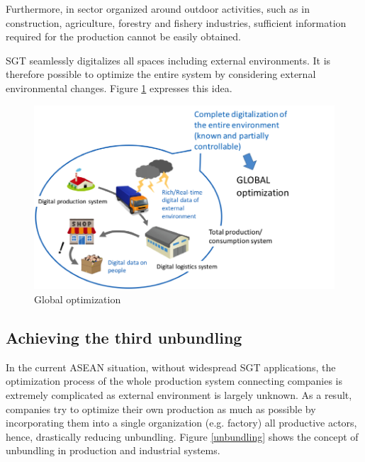 Furthermore, in sector organized around outdoor activities, such as in construction, agriculture, forestry and fishery industries, sufficient information required for the production cannot be easily obtained. 

\vspace{0.4 cm}

SGT seamlessly digitalizes all spaces including external environments. It is therefore possible to optimize the entire system by considering external environmental changes. Figure \ref{global_optimization} expresses this idea.

\begin{figure}[H]
\begin{center}
\includegraphics[width = 0.8\linewidth]{Figures/global_optimization.png}
\end{center}
\caption{Global optimization}
\label{global_optimization}
\end{figure}


\subsection{Achieving the third unbundling} \label{unbundling_p}

\tab In the current ASEAN situation, without widespread SGT applications, the optimization process of the whole production system connecting companies is extremely complicated as external environment is largely unknown. As a result, companies try to optimize their own production as much as possible by incorporating them into a single organization (e.g. factory) all productive actors, hence, drastically reducing unbundling. Figure \ref{unbundling} shows the concept of unbundling in production and industrial systems.

